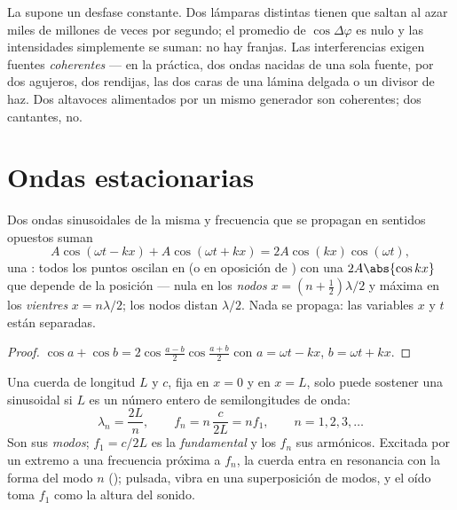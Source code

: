 \begin{remark}[Coherencia]\label{rem:b1:wave-propagation:coherence}
La  supone un desfase constante. Dos lámparas distintas
tienen  que saltan al azar miles de millones de veces por segundo; el
promedio de $\cos\Delta\varphi$ es nulo y las intensidades simplemente se
suman: no hay franjas. Las interferencias exigen fuentes
\emph{coherentes} --- en la práctica, dos ondas nacidas de una sola
fuente, por dos agujeros, dos rendijas, las dos caras de una lámina
delgada o un divisor de haz. Dos altavoces alimentados por un mismo
generador son coherentes; dos cantantes, no.
\end{remark}

\section{Ondas estacionarias}

\begin{theorem}\label{thm:b1:wave-propagation:standing}
Dos ondas sinusoidales de la misma  y frecuencia que se propagan
en sentidos opuestos suman
\[
A\cos(\omega t - kx) + A\cos(\omega t + kx) = 2A\cos(kx)\cos(\omega t),
\]
una \emph{}: todos los puntos oscilan en  (o en
oposición de ) con una  $2A\abs{\cos kx}$ que depende de la
posición --- nula en los \emph{nodos} $x = (n + \tfrac12)\lambda/2$ y
máxima en los \emph{vientres} $x = n\lambda/2$; los nodos distan
$\lambda/2$. Nada se propaga: las variables $x$ y $t$ están separadas.
\end{theorem}

\begin{proof}
$\cos a + \cos b = 2\cos\frac{a - b}{2}\cos\frac{a + b}{2}$ con
$a = \omega t - kx$, $b = \omega t + kx$.
\end{proof}

\begin{proposition}\label{prop:b1:wave-propagation:modes}
Una cuerda de longitud $L$ y  $c$, fija en $x = 0$ y en $x = L$,
solo puede sostener una  sinusoidal si $L$ es un número
entero de semilongitudes de onda:
\[
\lambda_n = \frac{2L}{n}, \qquad f_n = n\,\frac{c}{2L} = n f_1,
\qquad n = 1, 2, 3, \dots
\]
Son sus \emph{modos}; $f_1 = c/2L$ es la \emph{fundamental} y los $f_n$
sus armónicos. Excitada por un extremo a una frecuencia próxima a $f_n$,
la cuerda entra en resonancia con la forma del modo $n$ (); pulsada, vibra en una superposición de modos, y el oído toma $f_1$
como la altura del sonido.
\end{proposition}

